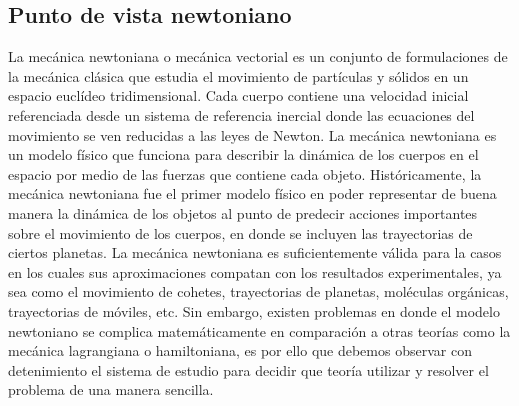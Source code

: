 \subsection{Punto de vista newtoniano}
La mecánica newtoniana o mecánica vectorial es un conjunto de formulaciones de la mecánica clásica que estudia el movimiento de partículas y sólidos en un espacio euclídeo tridimensional. Cada cuerpo contiene una velocidad inicial referenciada desde un sistema de referencia inercial donde las ecuaciones del movimiento se ven reducidas a las leyes de Newton. La mecánica newtoniana es un modelo físico que funciona para describir la dinámica de los cuerpos en el espacio por medio de las fuerzas que contiene cada objeto. Históricamente, la mecánica newtoniana fue el primer modelo físico en poder representar de buena manera la dinámica de los objetos al punto de predecir acciones importantes sobre el movimiento de los cuerpos, en donde se incluyen las trayectorias de ciertos planetas. La mecánica newtoniana es suficientemente válida para la casos en los cuales sus aproximaciones compatan con los resultados experimentales, ya sea como el movimiento de cohetes, trayectorias de planetas, moléculas orgánicas, trayectorias de móviles, etc. Sin embargo, existen problemas en donde el modelo newtoniano se complica matemáticamente en comparación a otras teorías como la mecánica lagrangiana o hamiltoniana, es por ello
que debemos observar con detenimiento el sistema de estudio para decidir que teoría utilizar y resolver el problema de una manera sencilla.
